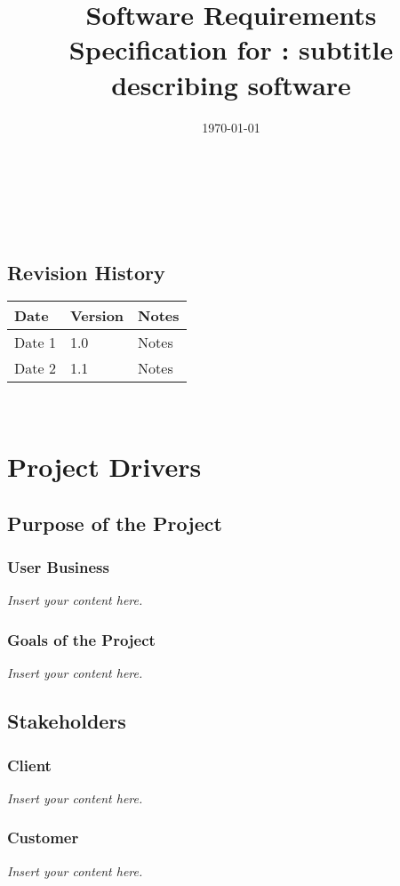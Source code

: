\documentclass[12pt]{article}
\newcommand{\lips}{\textit{Insert your content here.}}
\begin{document}
\title{Software Requirements Specification for \progname: subtitle describing software} 
\author{\authname}
\date{\today}
	
\maketitle

~\newpage


\tableofcontents

~\newpage

\subsection*{Revision History}

\begin{tabularx}{\textwidth}{p{3cm}p{2cm}X}
\toprule {\textbf{Date}} & {\textbf{Version}} & {\textbf{Notes}}\\
\midrule
Date 1 & 1.0 & Notes\\
Date 2 & 1.1 & Notes\\
\bottomrule
\end{tabularx}

~\newpage
\section{Project Drivers}
\subsection{Purpose of the Project}
\subsubsection{User Business}
\lips
\subsubsection{Goals of the Project}
\lips
\subsection{Stakeholders}
\subsubsection{Client}
\lips
\subsubsection{Customer}
\lips
\end{document}
